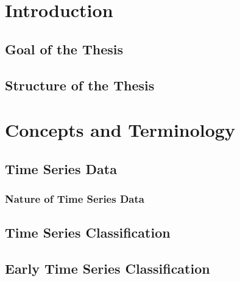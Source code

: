 \renewcommand*\contentsname{Table of Contents}
\tableofcontents
\thispagestyle{empty}
 
 \null\newpage
{} 






\thispagestyle{empty}
\null\newpage
{} 
\section{Introduction}

\subsection{Goal of the Thesis}

\subsection{Structure of the Thesis}


\null\newpage

\section{Concepts and Terminology}

\subsection{Time Series Data}

\subsubsection{Nature of Time Series Data}

\subsection{Time Series Classification}

\subsection{Early Time Series Classification}


